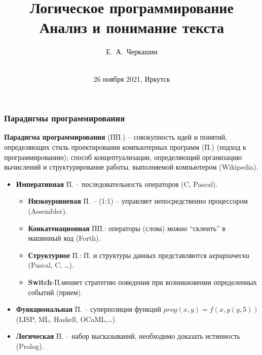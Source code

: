 \documentclass[10pt]{beamer}
\begin{document}
\title{Логическое программирование\\ Анализ и понимание текста}

\author{Е.~А.~Черкашин}
\date[2019]{{}\\[1.5cm]
26 ноября 2021, Иркутск
}
\maketitle


\begin{frame}
  \frametitle{Парадигмы программирования}
  \textbf{Парадигма программирования} (ПП.) -- совокупность идей и понятий, определяющих стиль проектирования компьютерных программ (П.) (подход к программированию);
  способ концептуализации, определяющий организацию вычислений и структурирование работы, выполняемой компьютером (Wikipedia).
  \begin{itemize}
  \item \textbf{Императивная} П. -- последовательность операторов (C, Pascal).
    \begin{itemize}
     \item \textbf{Низкоуровневая} П. -- (1:1) -- управляет непосредственно процессором (Assembler).
     \item \textbf{Конкатенационная} ПП.: операторы (слова) можно ``склеить'' в машинный код (Forth).
     \item \textbf{Структурное} П.: П. и структуры данных представляются \emph{иерархически} (Pascal, C, \ldots).
     \item \textbf{Switch}-П.меняет стратегию поведения при возникновении определенных событий (прием).
    \end{itemize}
  \item \textbf{Функциональная} П. -- суперпозиция функций $prog(x,y) = f(x,g(y,5))$ (LISP, ML, Haskell, OCaML,\ldots).
  \item \textbf{Логическая} П. -- набор высказываний, необходимо доказать истинность (Prolog).
  \end{itemize}
\end{frame}
\end{document}
